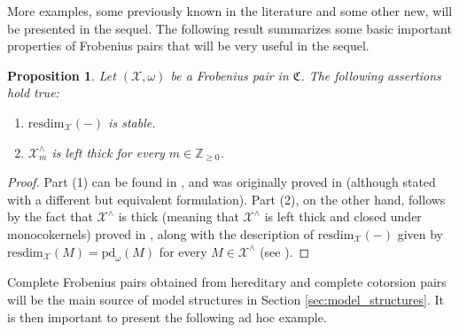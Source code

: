\documentclass[10pt,reqno]{amsart}
\numberwithin{equation}{section}
\newtheorem{proposition}[definition]{Proposition}
\theoremstyle{remark}
\newcommand{\X}{\mathcal{X}}
\newcommand{\pd}{\mathrm{pd}}
\newcommand{\resdim}{\mathrm{resdim}}
\begin{document}
More examples, some previously known in the literature and some other new, will be presented in the sequel. The following result summarizes some basic important properties of Frobenius pairs that will be very useful in the sequel. 


\begin{proposition}\label{prop:Frobenius_stable}  
Let $(\mathcal{X},\omega)$ be a Frobenius pair in $\mathfrak{C}$. The following assertions hold true:
\begin{enumerate}[(1)]
\item $\resdim_{\mathcal{X}}(-)$ is stable.

\item $\X^\wedge_m$ is left thick for every $m \in \mathbb{Z}_{\geq 0}$.
\end{enumerate}  
\end{proposition}


\begin{proof}
Part (1) can be found in \cite[Prop. 2.14]{BMS}, and was originally proved in \cite[Prop. 3.3]{AB89} (although stated with a different but equivalent formulation). Part (2), on the other hand, follows by the fact that $\X^\wedge$ is thick (meaning that $\X^\wedge$ is left thick and closed under monocokernels) proved in \cite[Thm. 2.11]{BMSP}, along with the description of $\resdim_{\X}(-)$ given by $\resdim_{\X}(M) = \pd_{\omega}(M)$ for every $M \in \X^\wedge$ (see \cite[Thm. 2.10]{BMSP}).
\end{proof}


Complete Frobenius pairs obtained from hereditary and complete cotorsion pairs will be the main source of model structures in Section \ref{sec:model_structures}. It is then important to present the following ad hoc example. 
\end{document}
